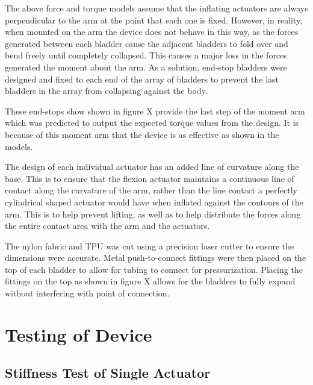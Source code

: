 \documentclass[letterpaper, 10 pt, conference]{ieeeconf}  %
\begin{document}
The above force and torque models assume that the inflating actuators are always perpendicular to the arm at the point that each one is fixed.  However, in reality, when mounted on the arm the device does not behave in this way, as the forces generated between each bladder cause the adjacent bladders to fold over and bend freely until completely collapsed.  This causes a major loss in the forces generated the moment about the arm.  As a solution, end-stop bladders were designed and fixed to each end of the array of bladders to prevent the last bladders in the array from collapsing against the body.

These end-stops show shown in figure X provide the last step of the moment arm which was predicted to output the expected torque values from the design.  It is because of this moment arm that the device is as effective as shown in the models.  


The design of each individual actuator has an added line of curvature along the base.  This is to ensure that the flexion actuator maintains a continuous line of contact along the curvature of the arm, rather than the line contact a perfectly cylindrical shaped actuator would have when inflated against the contours of the arm.  This is to help prevent lifting, as well as to help distribute the forces along the entire contact area with the arm and the actuators. 

The nylon fabric and TPU was cut using a precision laser cutter to ensure the dimensions were accurate.  Metal push-to-connect fittings were then placed on the top of each bladder to allow for tubing to connect for pressurization.  Placing the fittings on the top as shown in figure X allows for the bladders to fully expand without interfering with point of connection.


\section{Testing of Device}

\subsection{Stiffness Test of Single Actuator}
\end{document}
